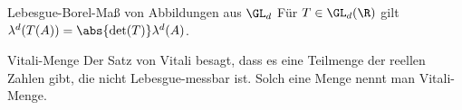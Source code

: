 \begin{karte}{Lebesgue-Borel-Maß von Abbildungen aus \(\GL_d\)}
	Für \( T \in \GL_d(\R) \) gilt \( \lambda^d(T(A)) = \abs{\det(T)}\lambda^d(A) \).
\end{karte}
\begin{karte}{Vitali-Menge}
	Der Satz von Vitali besagt, dass es eine Teilmenge der reellen Zahlen gibt, die 
	nicht Lebesgue-messbar ist. Solch eine Menge nennt man Vitali-Menge.
\end{karte}
